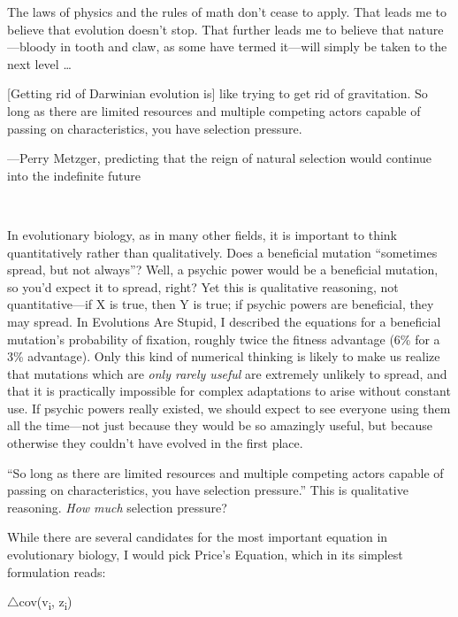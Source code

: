 
{
 The laws of physics and the rules of math don't
cease to apply. That leads me to believe that evolution
doesn't stop. That further leads me to believe that
nature---bloody in tooth and claw, as some have termed it---will simply
be taken to the next level \ldots}

{
 [Getting rid of Darwinian evolution is] like trying to get rid of
gravitation. So long as there are limited resources and multiple
competing actors capable of passing on characteristics, you have
selection pressure.}

{\raggedleft
 {}---Perry Metzger, predicting that the reign of natural selection
would continue into the indefinite future
\par}


\bigskip

{
 ~}

{
 In evolutionary biology, as in many other fields, it is important
to think quantitatively rather than qualitatively. Does a beneficial
mutation ``sometimes spread, but not
always''? Well, a psychic power would be a beneficial
mutation, so you'd expect it to spread, right? Yet this
is qualitative reasoning, not quantitative---if X is true, then Y is
true; if psychic powers are beneficial, they may spread. In Evolutions
Are Stupid, I described the equations for a beneficial
mutation's probability of fixation, roughly twice the
fitness advantage (6\% for a 3\% advantage). Only this kind of
numerical thinking is likely to make us realize that mutations which
are \textit{only rarely useful} are extremely unlikely to spread, and
that it is practically impossible for complex adaptations to arise
without constant use. If psychic powers really existed, we should
expect to see everyone using them all the time---not just because they
would be so amazingly useful, but because otherwise they
couldn't have evolved in the first place.}

{
 ``So long as there are limited resources and
multiple competing actors capable of passing on characteristics, you
have selection pressure.'' This is qualitative
reasoning. \textit{How much} selection pressure?}

{
 While there are several candidates for the most important equation
in evolutionary biology, I would pick Price's Equation,
which in its simplest formulation reads:}

{\centering
 ${\triangle}$cov(v\textsubscript{i}, z\textsubscript{i})
\par}


